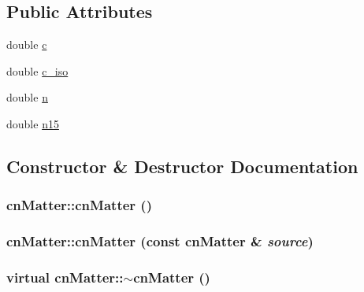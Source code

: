 \subsection*{Public Attributes}
\begin{DoxyCompactItemize}
\item 
double \hyperlink{classcn_matter_ad1d68c3a937d7111070aa0821c6c10f9}{c}
\item 
double \hyperlink{classcn_matter_ab65edcd54562238a4ca1e1c10e7abad1}{c\_\-iso}
\item 
double \hyperlink{classcn_matter_aeae2078338cb768beda7ab04d69a1479}{n}
\item 
double \hyperlink{classcn_matter_a80822025457f202cd4199fb4a1a61ded}{n15}
\end{DoxyCompactItemize}


\subsection{Constructor \& Destructor Documentation}
\hypertarget{classcn_matter_a8a07b87102cd364c23e5b8e48ade6433}{
\subsubsection[{cnMatter}]{\setlength{\rightskip}{0pt plus 5cm}cnMatter::cnMatter ()}}
\label{classcn_matter_a8a07b87102cd364c23e5b8e48ade6433}
\hypertarget{classcn_matter_aae88d7e5f5b03a570cbd616af5f67c49}{
\subsubsection[{cnMatter}]{\setlength{\rightskip}{0pt plus 5cm}cnMatter::cnMatter (const {\bf cnMatter} \& {\em source})}}
\label{classcn_matter_aae88d7e5f5b03a570cbd616af5f67c49}
\hypertarget{classcn_matter_a03f21518aa68037d4481d87907c8b2e2}{
\subsubsection[{$\sim$cnMatter}]{\setlength{\rightskip}{0pt plus 5cm}virtual cnMatter::$\sim$cnMatter ()}}
\label{classcn_matter_a03f21518aa68037d4481d87907c8b2e2}


